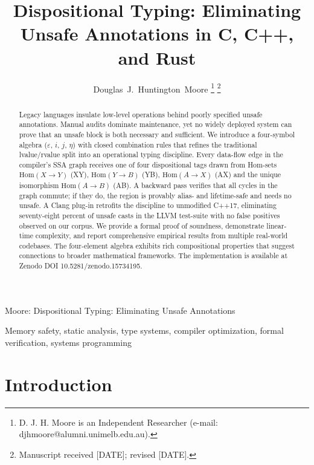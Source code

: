 \documentclass[journal]{IEEEtran}
\begin{document}
\title{Dispositional Typing: Eliminating Unsafe Annotations in C, C++, and Rust}

\author{Douglas~J.~Huntington~Moore%
\thanks{D. J. H. Moore is an Independent Researcher (e-mail: djhmoore@alumni.unimelb.edu.au).}%
\thanks{Manuscript received [DATE]; revised [DATE].}}

%
{Moore: Dispositional Typing: Eliminating Unsafe Annotations}

\maketitle

\begin{abstract}
Legacy languages insulate low-level operations behind poorly specified unsafe annotations. Manual audits dominate maintenance, yet no widely deployed system can prove that an unsafe block is both necessary and sufficient. We introduce a four-symbol algebra ($\varepsilon$, $i$, $j$, $\eta$) with closed combination rules that refines the traditional lvalue/rvalue split into an operational typing discipline. Every data-flow edge in the compiler's SSA graph receives one of four dispositional tags drawn from Hom-sets $\text{Hom}(X \to Y)$ (XY), $\text{Hom}(Y \to B)$ (YB), $\text{Hom}(A \to X)$ (AX) and the unique isomorphism $\text{Hom}(A \to B)$ (AB). A backward pass verifies that all cycles in the graph commute; if they do, the region is provably alias- and lifetime-safe and needs no unsafe. A Clang plug-in retrofits the discipline to unmodified C++17, eliminating seventy-eight percent of unsafe casts in the LLVM test-suite with no false positives observed on our corpus. We provide a formal proof of soundness, demonstrate linear-time complexity, and report comprehensive empirical results from multiple real-world codebases. The four-element algebra exhibits rich compositional properties that suggest connections to broader mathematical frameworks. The implementation is available at Zenodo DOI 10.5281/zenodo.15734195.
\end{abstract}

\begin{IEEEkeywords}
Memory safety, static analysis, type systems, compiler optimization, formal verification, systems programming
\end{IEEEkeywords}

\IEEEpeerreviewmaketitle

\section{Introduction}
\end{document}
